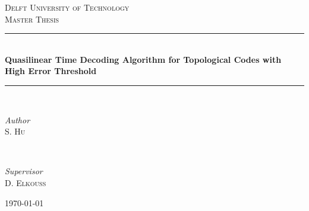\begin{titlepage}
	\newcommand{\HRule}{\rule{\linewidth}{0.3mm}}
	\center

	\textsc{\Large Delft University of Technology}\\[1.5cm]

	\textsc{\large Master Thesis}\\[0.5cm]

    \vfill

	\HRule\\[1cm]

	{\huge\bfseries Quasilinear Time Decoding Algorithm for Topological Codes with High Error Threshold}\\[0.4cm]

	\HRule\\[1.8cm]

	\begin{minipage}{0.4\textwidth}
		\begin{flushleft}
			\large
			\textit{Author}\\
			S. \textsc{Hu}
		\end{flushleft}
	\end{minipage}
	~
	\begin{minipage}{0.4\textwidth}
		\begin{flushright}
			\large
			\textit{Supervisor}\\
			D. \textsc{Elkouss} %
		\end{flushright}
	\end{minipage}



	\vfill\vfill\vfill %

	{\large\today} %
	\vfill %

\end{titlepage}
